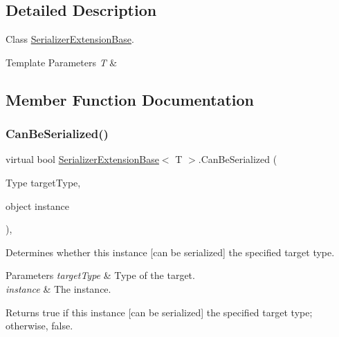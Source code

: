 \subsection{Detailed Description}
Class \hyperlink{class_serializer_extension_base}{Serializer\+Extension\+Base}. 


\begin{DoxyTemplParams}{Template Parameters}
{\em T} & \\
\hline
\end{DoxyTemplParams}


\subsection{Member Function Documentation}
\mbox{\label{class_serializer_extension_base_a50e69037fda6bdcc080cdc3c51d25b99}} 
\subsubsection{\texorpdfstring{Can\+Be\+Serialized()}{CanBeSerialized()}}
{\footnotesize\ttfamily virtual bool \hyperlink{class_serializer_extension_base}{Serializer\+Extension\+Base}$<$ T $>$.Can\+Be\+Serialized (\begin{DoxyParamCaption}\item[{Type}]{target\+Type,  }\item[{object}]{instance }\end{DoxyParamCaption})\hspace{0.3cm}{\ttfamily [inline]}, {\ttfamily [virtual]}}



Determines whether this instance \mbox{[}can be serialized\mbox{]} the specified target type. 


\begin{DoxyParams}{Parameters}
{\em target\+Type} & Type of the target.\\
\hline
{\em instance} & The instance.\\
\hline
\end{DoxyParams}
\begin{DoxyReturn}{Returns}
{\ttfamily true} if this instance \mbox{[}can be serialized\mbox{]} the specified target type; otherwise, {\ttfamily false}.
\end{DoxyReturn}


